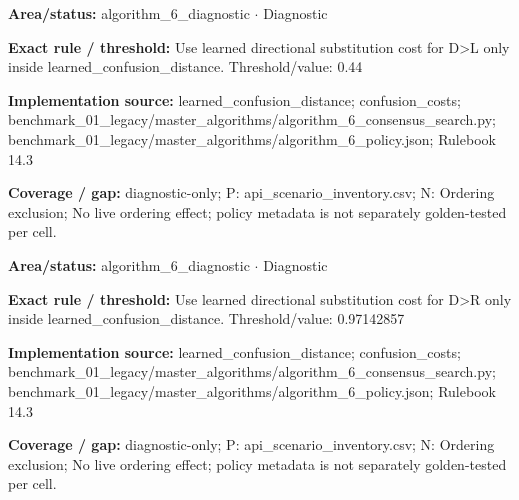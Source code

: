 \begin{tcolorbox}[enhanced,breakable,colback=white,colframe=Muted!45,boxrule=0.45pt,arc=1.5pt,left=6pt,right=6pt,top=5pt,bottom=5pt,title={\texttt{A6-LEARNED-SUBSTITUTION-D-L}},title after break={\texttt{A6-LEARNED-SUBSTITUTION-D-L}\ (continued)},fonttitle=\headingfont\bfseries\color{Navy},coltitle=Navy]
\textbf{Area/status:} algorithm\_\allowbreak{}6\_\allowbreak{}diagnostic $\boldsymbol{\cdot}$ Diagnostic\par
\smallskip
\textbf{Exact rule / threshold:} Use learned directional substitution cost for D>L only inside learned\_\allowbreak{}confusion\_\allowbreak{}distance. Threshold/\allowbreak{}value: 0.44\par
\smallskip
\textbf{Implementation source:} learned\_\allowbreak{}confusion\_\allowbreak{}distance; confusion\_\allowbreak{}costs; benchmark\_\allowbreak{}01\_\allowbreak{}legacy/\allowbreak{}master\_\allowbreak{}algorithms/\allowbreak{}algorithm\_\allowbreak{}6\_\allowbreak{}consensus\_\allowbreak{}search.py; benchmark\_\allowbreak{}01\_\allowbreak{}legacy/\allowbreak{}master\_\allowbreak{}algorithms/\allowbreak{}algorithm\_\allowbreak{}6\_\allowbreak{}policy.json; Rulebook 14.3\par
\smallskip
\textbf{Coverage / gap:} diagnostic-only; P: api\_\allowbreak{}scenario\_\allowbreak{}inventory.csv; N: Ordering exclusion; No live ordering effect; policy metadata is not separately golden-tested per cell.
\end{tcolorbox}
\begin{tcolorbox}[enhanced,breakable,colback=white,colframe=Muted!45,boxrule=0.45pt,arc=1.5pt,left=6pt,right=6pt,top=5pt,bottom=5pt,title={\texttt{A6-LEARNED-SUBSTITUTION-D-R}},title after break={\texttt{A6-LEARNED-SUBSTITUTION-D-R}\ (continued)},fonttitle=\headingfont\bfseries\color{Navy},coltitle=Navy]
\textbf{Area/status:} algorithm\_\allowbreak{}6\_\allowbreak{}diagnostic $\boldsymbol{\cdot}$ Diagnostic\par
\smallskip
\textbf{Exact rule / threshold:} Use learned directional substitution cost for D>R only inside learned\_\allowbreak{}confusion\_\allowbreak{}distance. Threshold/\allowbreak{}value: 0.97142857\par
\smallskip
\textbf{Implementation source:} learned\_\allowbreak{}confusion\_\allowbreak{}distance; confusion\_\allowbreak{}costs; benchmark\_\allowbreak{}01\_\allowbreak{}legacy/\allowbreak{}master\_\allowbreak{}algorithms/\allowbreak{}algorithm\_\allowbreak{}6\_\allowbreak{}consensus\_\allowbreak{}search.py; benchmark\_\allowbreak{}01\_\allowbreak{}legacy/\allowbreak{}master\_\allowbreak{}algorithms/\allowbreak{}algorithm\_\allowbreak{}6\_\allowbreak{}policy.json; Rulebook 14.3\par
\smallskip
\textbf{Coverage / gap:} diagnostic-only; P: api\_\allowbreak{}scenario\_\allowbreak{}inventory.csv; N: Ordering exclusion; No live ordering effect; policy metadata is not separately golden-tested per cell.
\end{tcolorbox}
